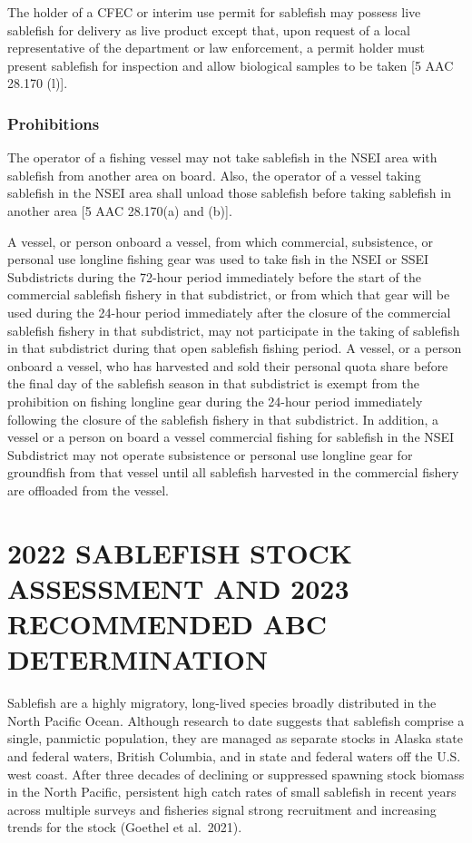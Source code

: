 \documentclass[
]{article}
\begin{document}
The holder of a CFEC or interim use permit for sablefish may possess live sablefish for delivery as live product except that, upon request of a local representative of the department or law enforcement, a permit holder must present sablefish for inspection and allow biological samples to be taken {[}5 AAC 28.170 (l){]}.

\hypertarget{prohibitions}{%
\subsubsection{Prohibitions}\label{prohibitions}}

The operator of a fishing vessel may not take sablefish in the NSEI area with sablefish from another area on board. Also, the operator of a vessel taking sablefish in the NSEI area shall unload those sablefish before taking sablefish in another area {[}5 AAC 28.170(a) and (b){]}.

A vessel, or person onboard a vessel, from which commercial, subsistence, or personal use longline fishing gear was used to take fish in the NSEI or SSEI Subdistricts during the 72-hour period immediately before the start of the commercial sablefish fishery in that subdistrict, or from which that gear will be used during the 24-hour period immediately after the closure of the commercial sablefish fishery in that subdistrict, may not participate in the taking of sablefish in that subdistrict during that open sablefish fishing period. A vessel, or a person onboard a vessel, who has harvested and sold their personal quota share before the final day of the sablefish season in that subdistrict is exempt from the prohibition on fishing longline gear during the 24-hour period immediately following the closure of the sablefish fishery in that subdistrict. In addition, a vessel or a person on board a vessel commercial fishing for sablefish in the NSEI Subdistrict may not operate subsistence or personal use longline gear for groundfish from that vessel until all sablefish harvested in the commercial fishery are offloaded from the vessel.

\hypertarget{sablefish-stock-assessment-and-2023-recommended-abc-determination}{%
\section{2022 SABLEFISH STOCK ASSESSMENT AND 2023 RECOMMENDED ABC DETERMINATION}\label{sablefish-stock-assessment-and-2023-recommended-abc-determination}}

Sablefish are a highly migratory, long-lived species broadly distributed in the North Pacific Ocean. Although research to date suggests that sablefish comprise a single, panmictic population, they are managed as separate stocks in Alaska state and federal waters, British Columbia, and in state and federal waters off the U.S. west coast. After three decades of declining or suppressed spawning stock biomass in the North Pacific, persistent high catch rates of small sablefish in recent years across multiple surveys and fisheries signal strong recruitment and increasing trends for the stock (Goethel et al.~2021).
\end{document}
